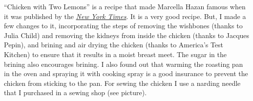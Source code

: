 \documentclass[11pt,letterpaper]{article}
\begin{document}


``Chicken with Two Lemons'' is a recipe that made Marcella Hazan famous when it was published by the \href{https://cooking.nytimes.com/recipes/1015182-marcella-hazans-roast-chicken-with-lemons}{\it New York Times}. It is a very good recipe. But, I made a few changes to it, incorporating the steps of removing the wishbones (thanks to Julia Child) and removing the kidneys from inside the chicken (thanks to Jacques Pepin), and  brining and air drying the chicken (thanks to America's Test Kitchen) to ensure that it results in a moist breast meet. The sugar in the brining also encourages brining. I also found out that warming the roasting pan in the oven and spraying it with cooking spray is a good insurance to prevent the chicken from sticking to the pan. For sewing the chicken I use a narding needle that I purchased in a sewing shop (see picture).
\end{document}
